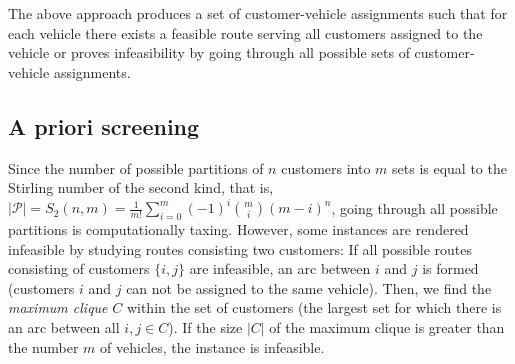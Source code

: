 \documentclass[dissertation,draft*]{aaltoseries}
\begin{document}
% 
% 


The above approach produces a set of customer-vehicle assignments 
such that for each vehicle there exists a feasible route serving all customers assigned to the vehicle
or proves infeasibility by going through all possible sets of customer-vehicle assignments.


\subsection{A priori screening}
\label{earlydetection}
Since the  
number of possible partitions of $n$ customers into $m$ sets is equal to the Stirling number of the second kind, that is,
$|\mathcal{P}| = S_2(n,m) = \frac {1}{m!} \sum_{i=0}^{m} (-1)^i {m \choose i} (m-i)^n$,
going through all possible partitions is computationally taxing. However, some instances 
are rendered infeasible by studying routes consisting two customers: 
If all possible routes consisting of customers $\{i,j\}$ are infeasible, an arc between $i$ and $j$ is formed 
(customers $i$ and $j$ can not be assigned to the same vehicle). Then, we find the \emph{maximum clique} $C$
within the set of customers (the largest set for which there is
an arc between all $i,j \in C$). If the size $|C|$ of the maximum clique
is greater than the number $m$ of vehicles, the instance is infeasible.
\end{document}
